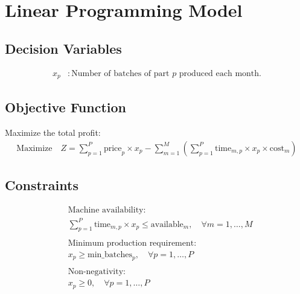 \documentclass{article}
\begin{document}
\section*{Linear Programming Model}

\subsection*{Decision Variables}
\begin{align*}
x_p & : \text{Number of batches of part } p \text{ produced each month.}
\end{align*}

\subsection*{Objective Function}
Maximize the total profit:
\begin{align*}
\text{Maximize} \quad Z = \sum_{p=1}^{P} \text{price}_p \times x_p - \sum_{m=1}^{M} \left( \sum_{p=1}^{P} \text{time}_{m,p} \times x_p \times \text{cost}_m \right)
\end{align*}

\subsection*{Constraints}
\begin{align*}
& \text{Machine availability:} \\
& \sum_{p=1}^{P} \text{time}_{m,p} \times x_p \leq \text{available}_m, \quad \forall m = 1, \ldots, M \\
\\
& \text{Minimum production requirement:} \\
& x_p \geq \text{min\_batches}_p, \quad \forall p = 1, \ldots, P \\
\\
& \text{Non-negativity:} \\
& x_p \geq 0, \quad \forall p = 1, \ldots, P
\end{align*}
\end{document}
